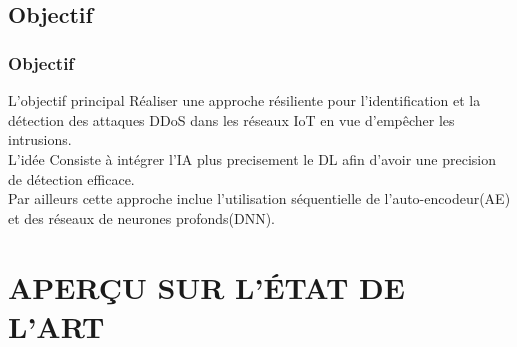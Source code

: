 \documentclass[aspectratio=169,professionalfonts, 12pt]{beamer}
\begin{document}
\begin{frame}
\begin{columns}
\begin{column}{0.3\textwidth}
\begin{figure}
		\end{figure}
	\end{column}            
\end{columns}
\textbf{}\\

\textbf{}\\

\end{frame}

\subsection{Objectif}
\begin{frame}
    \frametitle{Objectif}
    \begin{block}{L'objectif principal}
     Réaliser une approche résiliente pour l’identification et la détection des attaques DDoS dans les réseaux IoT en vue d'empêcher les intrusions.\\
L'idée Consiste à intégrer l'IA plus precisement le DL afin d'avoir une precision de détection efficace. \\
Par ailleurs cette approche inclue l’utilisation séquentielle de l’auto-encodeur(AE) et des réseaux de neurones profonds(DNN).
\end{block}     
   
\end{frame}

\section{APERÇU SUR L'\'ETAT DE L'ART}
\end{document}
